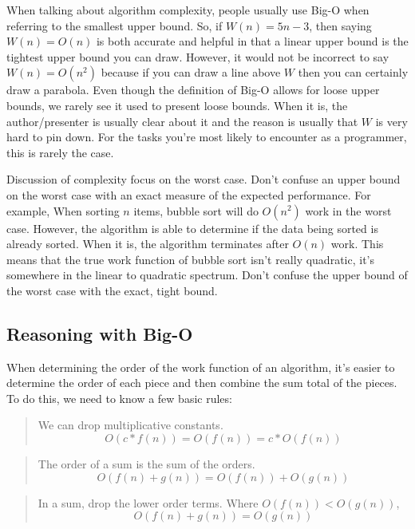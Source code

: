 \documentclass[]{tufte-handout}
\begin{document}
When talking about algorithm complexity, people usually use Big-O when referring to the smallest upper bound.  So, if $W(n)= 5n- 3$, then saying $W(n) = O(n)$ is both accurate and helpful in that a linear upper bound is the tightest upper bound you can draw.  However, it would not be incorrect to say $W(n) = O(n^2)$ because if you can draw a line above $W$ then you can certainly draw a parabola. Even though the definition of Big-O allows for loose upper bounds, we rarely see it used to present loose bounds.  When it is, the author/presenter is usually clear about it and the reason is usually that $W$ is very hard to pin down. For the tasks you're most likely to encounter as a programmer, this is rarely the case. 

Discussion of complexity focus on the worst case.  Don't confuse an upper bound on the worst case with an exact measure of the expected performance. For example, When sorting $n$ items, bubble sort will do $O(n^2)$ work in the worst case. However, the algorithm is able to determine if the data being sorted is already sorted. When it is, the algorithm terminates after $O(n)$ work.  This means that the true work function of bubble sort isn't really quadratic, it's somewhere in the linear to quadratic spectrum.  Don't confuse the upper bound of the worst case with the exact, tight bound. 

\subsection{Reasoning with Big-O}

When determining the order of the work function of an algorithm, it's easier to determine the order of each piece and then combine the sum total of the pieces.   To do this, we need to know a few basic rules:

\begin{quote}
We can drop multiplicative constants.
\[ O(c*f(n)) = O(f(n)) = c*O(f(n)) \]
\end{quote}

\begin{quote}
The order of a sum is the sum of the orders.
\[ O(f(n) + g(n)) = O(f(n)) + O(g(n)) \]
\end{quote}

\begin{quote}
In a sum, drop the lower order terms.  Where $O(f(n)) < O(g(n))$,
\[ O(f(n) + g(n)) = O(g(n)) \]
\end{quote}
\end{document}
